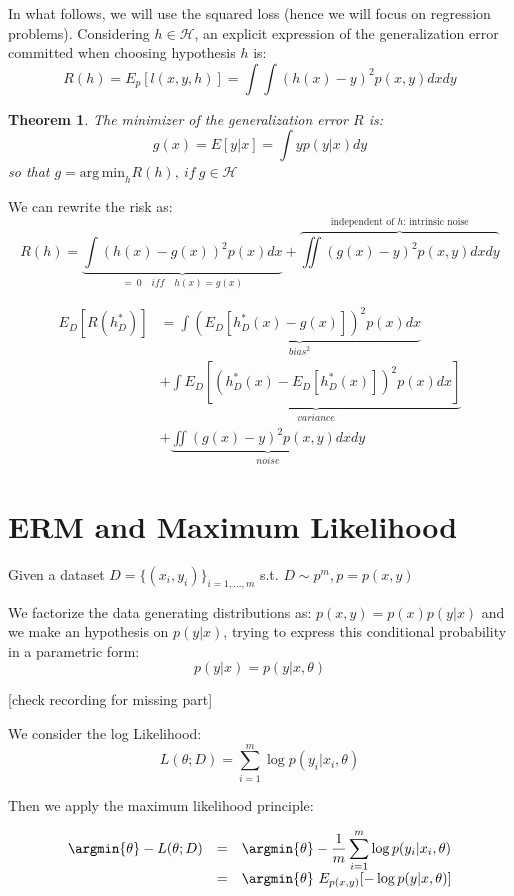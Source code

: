 In what follows, we will use the squared loss (hence we will focus on
regression problems). Considering $h \in \mathcal H$, an explicit expression of the generalization error committed when choosing hypothesis $h$ is:
$$
R(h) = E_p[l(x,y,h)] = \int \int (h(x) - y)^2 p(x,y) dx dy
$$

\newtheorem{theorem}{Theorem}
\begin{theorem}
    The minimizer of the generalization error $R$ is:
    $$
    \boxed{ g(x) = E[y|x] = \int y p(y|x) dy }
    $$
    so that $g = \mathrm{arg\,min}_h R(h),\ if\ g \in \mathcal H$
\end{theorem}

We can rewrite the risk as:
$$
R(h) = \underbrace{\int (h(x) - g(x))^2 p(x) dx}_{=\ 0 \quad iff \quad h(x) = g(x)} + \overbrace{\iint (g(x) - y)^2 p(x,y) dx dy}^{\text{independent of }h \text{: intrinsic noise}}
$$



$$
\begin{array}{rl}
E_D[R(h^*_D)]
& = \underbrace{\int ( E_D[h^*_D(x) - g(x)])^2 p(x) dx}_{bias^2} \\
& + \underbrace{\int E_D[(h^*_D(x) - E_D[h^*_D(x)])^2 p(x) dx]}_{variance} \\
& + \underbrace{\iint (g(x) - y)^2 p(x,y) dx dy}_{noise}
\end{array}
$$

\section{ERM and Maximum Likelihood}

Given a dataset $D = \{(x_i, y_i)\}_{i=1, \dots, m}$ s.t. $D \sim p^m, p = p(x,y)$

We factorize the data generating distributions as: $p(x,y) = p(x) p(y|x)$ and we make an hypothesis on $p(y|x)$, trying to express this conditional probability in a parametric form:
$$p(y|x) = p(y|x, \theta)$$

[check recording for missing part]

We consider the log Likelihood:
$$
L(\theta; D) = \sum_{i = 1}^m \log p(y_i | x_i, \theta)
$$

Then we apply the maximum likelihood principle:

$$
\begin{array}{rcl}
    \argmin{\theta} - L(\theta; D) &
    = & \argmin{\theta} - \dfrac 1m \displaystyle\sum_{i=1}^m \log p(y_i | x_i, \theta) \\
    & = & \argmin{\theta}\ E_{p(x,y)}[-\log p(y | x, \theta)]
\end{array}
$$

